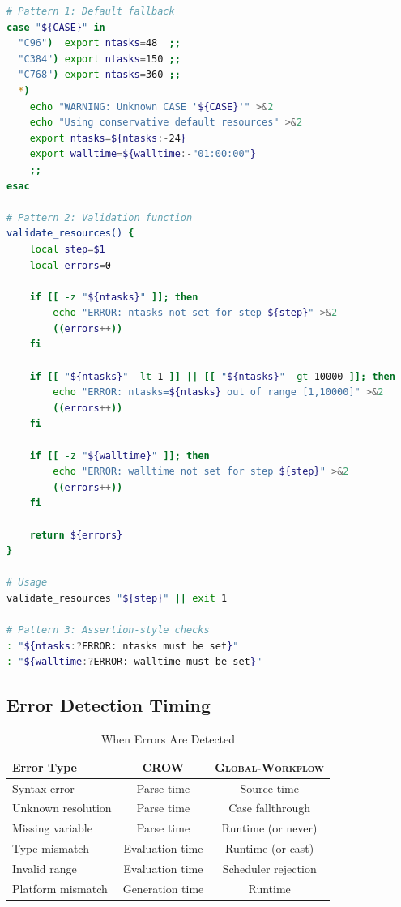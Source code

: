 \documentclass[11pt,twoside]{article}
\newcommand{\crow}{\textsc{CROW}}
\newcommand{\gw}{\textsc{Global-Workflow}}
\begin{document}
\begin{lstlisting}[language=Bash, caption={\gw{} Defensive Error Handling}]
# Pattern 1: Default fallback
case "${CASE}" in
  "C96")  export ntasks=48  ;;
  "C384") export ntasks=150 ;;
  "C768") export ntasks=360 ;;
  *)
    echo "WARNING: Unknown CASE '${CASE}'" >&2
    echo "Using conservative default resources" >&2
    export ntasks=${ntasks:-24}
    export walltime=${walltime:-"01:00:00"}
    ;;
esac

# Pattern 2: Validation function
validate_resources() {
    local step=$1
    local errors=0
    
    if [[ -z "${ntasks}" ]]; then
        echo "ERROR: ntasks not set for step ${step}" >&2
        ((errors++))
    fi
    
    if [[ "${ntasks}" -lt 1 ]] || [[ "${ntasks}" -gt 10000 ]]; then
        echo "ERROR: ntasks=${ntasks} out of range [1,10000]" >&2
        ((errors++))
    fi
    
    if [[ -z "${walltime}" ]]; then
        echo "ERROR: walltime not set for step ${step}" >&2
        ((errors++))
    fi
    
    return ${errors}
}

# Usage
validate_resources "${step}" || exit 1

# Pattern 3: Assertion-style checks
: "${ntasks:?ERROR: ntasks must be set}"
: "${walltime:?ERROR: walltime must be set}"
\end{lstlisting}

\subsection{Error Detection Timing}

\begin{table}[H]
\centering
\caption{When Errors Are Detected}
\label{tab:error-timing}
\begin{tabular}{@{}p{4cm}cc@{}}
\toprule
\textbf{Error Type} & \textbf{\crow{}} & \textbf{\gw{}} \\
\midrule
Syntax error & Parse time & Source time \\
Unknown resolution & Parse time & Case fallthrough \\
Missing variable & Parse time & Runtime (or never) \\
Type mismatch & Evaluation time & Runtime (or cast) \\
Invalid range & Evaluation time & Scheduler rejection \\
Platform mismatch & Generation time & Runtime \\
\bottomrule
\end{tabular}
\end{table}
\end{document}
